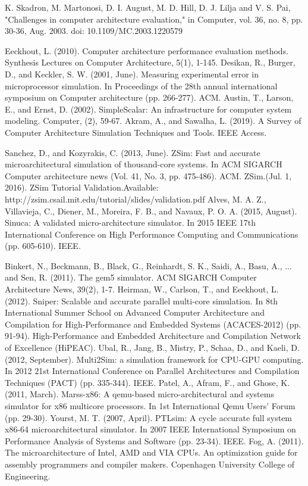 \documentclass[12pt]{article}
\begin{document}
\iffalse 
\begin{thebibliography}{00}
\footnotesize
{} K. Skadron, M. Martonosi, D. I. August, M. D. Hill, D. J. Lilja and V. S. Pai, "Challenges in computer architecture evaluation," in Computer, vol. 36, no. 8, pp. 30-36, Aug. 2003.
doi: 10.1109/MC.2003.1220579

 Eeckhout, L. (2010). Computer architecture performance evaluation methods. Synthesis Lectures on Computer Architecture, 5(1), 1-145.
 Desikan, R., Burger, D., and Keckler, S. W. (2001, June). Measuring experimental error in microprocessor simulation. In Proceedings of the 28th annual international symposium on Computer architecture (pp. 266-277). ACM.
 Austin, T., Larson, E., and Ernst, D. (2002). SimpleScalar: An infrastructure for computer system modeling. Computer, (2), 59-67.
 Akram, A., and Sawalha, L. (2019). A Survey of Computer Architecture Simulation Techniques and Tools. IEEE Access.

Sanchez, D., and Kozyrakis, C. (2013, June). ZSim: Fast and accurate microarchitectural simulation of thousand-core systems. In ACM SIGARCH Computer architecture news (Vol. 41, No. 3, pp. 475-486). ACM.
ZSim.(Jul. 1, 2016). ZSim Tutorial Validation.Available:
http://zsim.csail.mit.edu/tutorial/slides/validation.pdf
 Alves, M. A. Z., Villavieja, C., Diener, M., Moreira, F. B., and Navaux, P. O. A. (2015, August). Sinuca: A validated micro-architecture simulator. In 2015 IEEE 17th International Conference on High Performance Computing and Communications (pp. 605-610). IEEE.

 Binkert, N., Beckmann, B., Black, G., Reinhardt, S. K., Saidi, A., Basu, A., ... and Sen, R. (2011). The gem5 simulator. ACM SIGARCH Computer Architecture News, 39(2), 1-7.
 Heirman, W., Carlson, T., and Eeckhout, L. (2012). Sniper: Scalable and accurate parallel multi-core simulation. In 8th International Summer School on Advanced Computer Architecture and Compilation for High-Performance and Embedded Systems (ACACES-2012) (pp. 91-94). High-Performance and Embedded Architecture and Compilation Network of Excellence (HiPEAC).
 Ubal, R., Jang, B., Mistry, P., Schaa, D., and Kaeli, D. (2012, September). Multi2Sim: a simulation framework for CPU-GPU computing. In 2012 21st International Conference on Parallel Architectures and Compilation Techniques (PACT) (pp. 335-344). IEEE.
 Patel, A., Afram, F., and Ghose, K. (2011, March). Marss-x86: A qemu-based micro-architectural and systems simulator for x86 multicore processors. In 1st International Qemu Users’ Forum (pp. 29-30).
Yourst, M. T. (2007, April). PTLsim: A cycle accurate full system x86-64 microarchitectural simulator. In 2007 IEEE International Symposium on Performance Analysis of Systems and Software (pp. 23-34). IEEE.
Fog, A. (2011). The microarchitecture of Intel, AMD and VIA CPUs. An optimization guide for assembly programmers and compiler makers. Copenhagen University College of Engineering.


\end{thebibliography}
\end{document}
